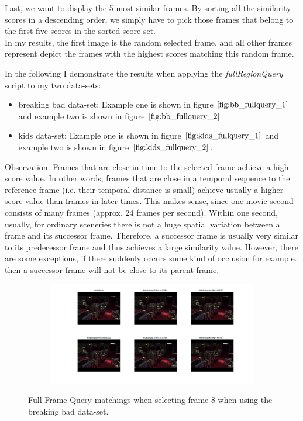 \documentclass{paper}
\begin{document}
Last, we want to display the 5 most similar frames. By sorting all the similarity scores in a descending order, we simply have to pick those frames that belong to the first five scores in the sorted score set. \\

In my results, the first image is the random selected frame, and all other frames represent depict the frames with the highest scores matching this random frame.

In the following I demonstrate the results when applying the \emph{fullRegionQuery} script to my two data-sets:  

\begin{itemize}
    \item breaking bad data-set: Example one is shown in figure $\ref{fig:bb_fullquery_1}$ and example two is shown in figure $\ref{fig:bb_fullquery_2}$.
    \item kids data-set: Example one is shown in figure $\ref{fig:kids_fullquery_1}$ and example two is shown in figure $\ref{fig:kids_fullquery_2}$.
\end{itemize}

Observation: Frames that are close in time to the selected frame achieve a high score value. In other words, frames that are close in a temporal sequence to the reference frame (i.e. their temporal distance is small) achieve usually a higher score value than frames in later times. This makes sense, since one movie second consists of many frames (approx. 24 frames per second). Within one second, usually, for ordinary sceneries there is not a huge spatial variation between a frame and its successor frame. Therefore, a successor frame is usually very similar to its predecessor frame and thus achieves a large similarity value. However, there are some exceptions, if there suddenly occurs some kind of occlusion for example. then a successor frame will not be close to its parent frame.

\begin{figure}[H]
\centering
\begin{subfigure}{1.0\textwidth}
\includegraphics[width=\textwidth]{figures/full_frame_queries/bb/fullQueries8}
\end{subfigure}
\caption{Full Frame Query matchings when selecting frame 8 when using the breaking bad data-set.}
\label{fig:bb_fullquery_1}
\end{figure}
\end{document}
